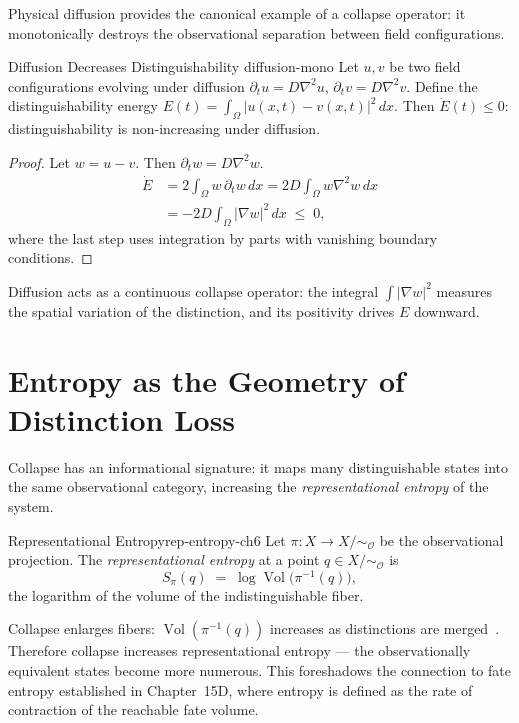 \documentclass[12pt,twoside,openright]{book}
\newcommand{\Vol}{\operatorname{Vol}}     %
\newcommand{\obs}{\mathcal{O}}
\providecommand{\quotientObs}{X/{\sim_{\obs}}}
\providecommand{\repEng}{E}
\providecommand{\repEntropy}{S_{\pi}}
\begin{document}
Physical diffusion provides the canonical example of a collapse
operator: it monotonically destroys the observational
separation between field configurations.

\begin{theorem}{Diffusion Decreases Distinguishability}%
  {diffusion-mono}
Let $u,v$ be two field configurations evolving under diffusion
$\partial_t u = D\nabla^2 u$, $\partial_t v = D\nabla^2 v$.
Define the distinguishability energy
$\repEng(t)=\int_\Omega |u(x,t)-v(x,t)|^2\,dx$.
Then $\dot{\repEng}(t)\le 0$: distinguishability is
non-increasing under diffusion.
\begin{proof}
Let $w=u-v$. Then $\partial_t w=D\nabla^2 w$.
\begin{align*}
  \dot{\repEng}
  &= 2\int_\Omega w\,\partial_t w\,dx
  = 2D\int_\Omega w\nabla^2 w\,dx \\
  &= -2D\int_\Omega |\nabla w|^2\,dx \;\le\; 0,
\end{align*}
where the last step uses integration by parts with vanishing
boundary conditions.
\end{proof}
\end{theorem}

Diffusion acts as a continuous collapse operator: the integral
$\int|\nabla w|^2$ measures the spatial variation of the
distinction, and its positivity drives $\repEng$ downward.

\section{Entropy as the Geometry of Distinction Loss}

Collapse has an informational signature: it maps many
distinguishable states into the same observational category,
increasing the \emph{representational entropy} of the system.

\begin{definition}{Representational Entropy}{rep-entropy-ch6}
Let $\pi:X\to\quotientObs$ be the observational projection.
The \emph{representational entropy} at a point $q\in\quotientObs$
is
\[
  \repEntropy(q)
  \;=\;
  \log\Vol\bigl(\pi^{-1}(q)\bigr),
\]
the logarithm of the volume of the indistinguishable fiber.
\end{definition}

Collapse enlarges fibers: $\Vol(\pi^{-1}(q))$ increases as
distinctions are merged~\cite{shannon1948}. Therefore collapse increases
representational entropy --- the observationally equivalent
states become more numerous. This foreshadows the connection
to fate entropy established in Chapter~15D, where entropy is
defined as the rate of contraction of the reachable fate volume.
\end{document}

